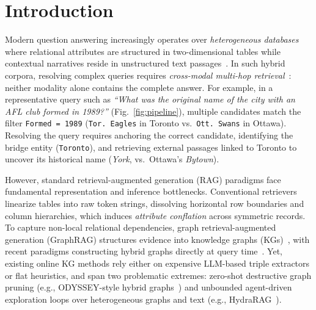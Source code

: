 \documentclass[runningheads]{llncs}
\begin{document}
\section{Introduction}
Modern question answering increasingly operates over \emph{heterogeneous databases} where relational attributes are structured in two-dimensional tables while contextual narratives reside in unstructured text passages~\cite{zhou2026tableqasurvey}. In such hybrid corpora, resolving complex queries requires \emph{cross-modal multi-hop retrieval}~\cite{hybridqa}: neither modality alone contains the complete answer. For example, in a representative query such as \emph{``What was the original name of the city with an AFL club formed in 1989?''} (Fig.~\ref{fig:pipeline}), multiple candidates match the filter \texttt{Formed = 1989} (\texttt{Tor. Eagles} in Toronto vs.\ \texttt{Ott. Swans} in Ottawa). Resolving the query requires anchoring the correct candidate, identifying the bridge entity (\texttt{Toronto}), and retrieving external passages linked to Toronto to uncover its historical name (\emph{York}, vs.\ Ottawa's \emph{Bytown}).

However, standard retrieval-augmented generation (RAG) paradigms face fundamental representation and inference bottlenecks. Conventional retrievers linearize tables into raw token strings, dissolving horizontal row boundaries and column hierarchies, which induces \emph{attribute conflation} across symmetric records. To capture non-local relational dependencies, graph retrieval-augmented generation (GraphRAG) structures evidence into knowledge graphs (KGs)~\cite{peng2024graphragsurvey}, with recent paradigms constructing hybrid graphs directly at query time~\cite{agarwal2025hybrid}. Yet, existing online KG methods rely either on expensive LLM-based triple extractors or flat heuristics, and span two problematic extremes: zero-shot destructive graph pruning (e.g., ODYSSEY-style hybrid graphs~\cite{agarwal2025hybrid}) and unbounded agent-driven exploration loops over heterogeneous graphs and text (e.g., HydraRAG~\cite{tan2025hydrarag}).
\end{document}
